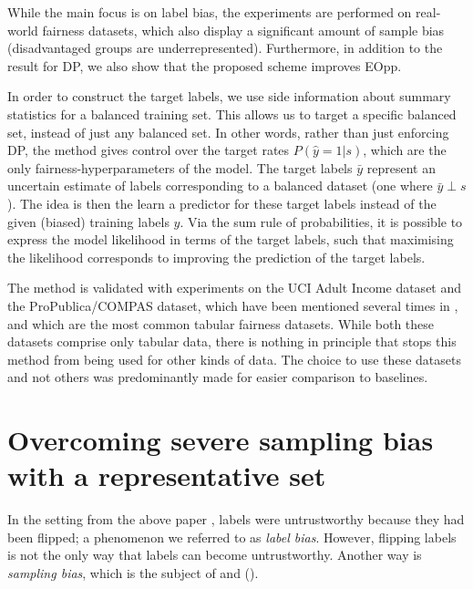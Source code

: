 While the main focus is on label bias,
the experiments are performed on real-world fairness datasets,
which also display a significant amount of sample bias (disadvantaged groups are underrepresented).
Furthermore, in addition to the result for \ac{DP}, we also show that the proposed scheme improves \acf{EOpp}.

In order to construct the target labels,
we use side information about summary statistics for a balanced training set.
This allows us to target a specific balanced set, instead of just any balanced set.
In other words, rather than just enforcing \ac{DP}, the method gives control over the target rates \(P(\hat{y}=1|s)\),
which are the only fairness-hyperparameters of the model.
The target labels \(\bar{y}\) represent an uncertain estimate of labels corresponding to a balanced dataset
(one where \(\bar{y} \perp s\)).
The idea is then the learn a predictor for these target labels instead of the given (biased) training labels \(y\).
Via the sum rule of probabilities, it is possible to express the model likelihood in terms of the target labels,
such that maximising the likelihood corresponds to improving the prediction of the target labels.

The method is validated with experiments
on the UCI Adult Income dataset and the ProPublica/COMPAS dataset,
which have been mentioned several times in ,
and which are the most common tabular fairness datasets.
While both these datasets comprise only tabular data,
there is nothing in principle that stops this method from being used for other kinds of data.
The choice to use these datasets and not others
was predominantly made for easier comparison to baselines.

\section{Overcoming severe sampling bias with a representative set}\label{sec:nifr}
In the setting from the above paper \citep{kehrenberg2020tuning},
labels were untrustworthy because they had been flipped;
a phenomenon we referred to as \emph{label bias}.
However, flipping labels is not the only way that labels can become untrustworthy.
Another way is \emph{sampling bias}, which is the subject of \citet{kehrenberg2020nullsampling} and \citet{kehrenberg2020zeroshot} ().

